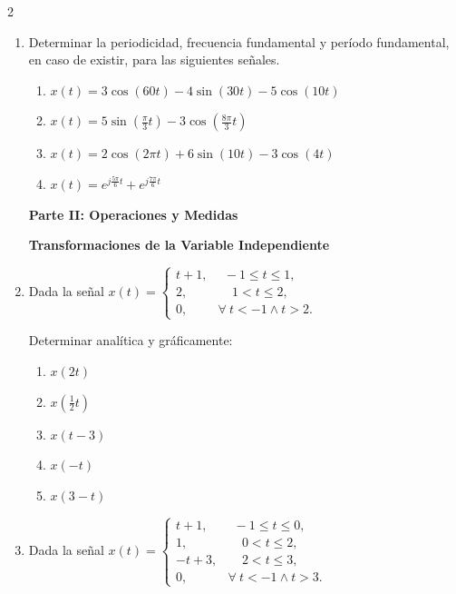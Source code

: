 \documentclass[10pt,a4paper]{article}
\begin{document}
\begin{multicols}{2}
\begin{enumerate}
			\textbf{Periodicidad}
			\item {Determinar la periodicidad, frecuencia fundamental y período fundamental, en caso de existir, para las siguientes señales.}
			\begin{enumerate}
				\item $x(t)=3 \cos(60t)-4\sin(30t)-5\cos(10t)$
				\item $x(t)=5\sin(\frac{\pi}{3}t)-3\cos(\frac{8\pi}{3}t)$
				\item $x(t)=2\cos(2\pi t)+6\sin(10t)-3\cos(4t)$
				\item $x(t)=e^{j\frac{5\pi}{6}t}+e^{j\frac{7\pi}{6}t}$
			\end{enumerate}

		\vspace{1em}
		\begin{center}
			\textbf{\large Parte II: Operaciones y Medidas}
		\end{center}
		\vspace{-0.5em}

			\textbf{Transformaciones de la Variable Independiente}
			\item Dada la señal $x(t)=
			\begin{cases}
			t+1, & ~~-1\leq t\leq 1, \\
			2, & ~~~~~1<t\leq 2, \\
			0, & \forall ~t<-1 \wedge t>2.
			\end{cases}$

			Determinar analítica y gráficamente:
			\begin{enumerate}
				\item $x(2t)$
				\item $x\left(\frac{1}{2}t\right)$
				\item $x(t-3)$
				\item $x(-t)$
				\item $x(3-t)$
			\end{enumerate}

			\item Dada la señal $x(t)=
			\begin{cases}
			t+1, & ~~-1\leq t\leq 0, \\
			1, & ~~~~~0<t\leq 2, \\
			-t+3, & ~~~~~2<t\leq 3, \\
			0, & \forall ~t<-1 \wedge t>3.
			\end{cases}$


\end{enumerate}
\end{multicols}
\end{document}
